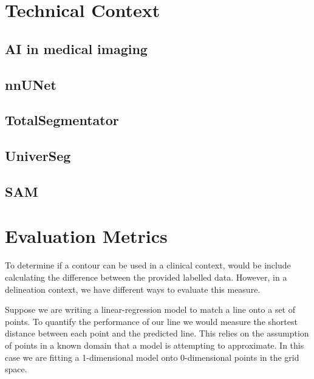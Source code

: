 \documentclass[12pt,twoside]{report}
\begin{document}
\section{Technical Context}
\subsection{AI in medical imaging}
\subsection{nnUNet}
\subsection{TotalSegmentator}
\subsection{UniverSeg}
\subsection{SAM}
\section{Evaluation Metrics}

To determine if a contour can be used in a clinical context, would be include calculating the difference between the provided labelled data. However, in a delineation context, we have different ways to evaluate this measure.

Suppose we are writing a linear-regression model to match a line onto a set of points. To quantify the performance of our line we would measure the shortest distance between each point and the predicted line. This relies on the assumption of points in a known domain that a model is attempting to approximate. In this case we are fitting a 1-dimensional model onto 0-dimensional points in the grid space.

\end{document}
